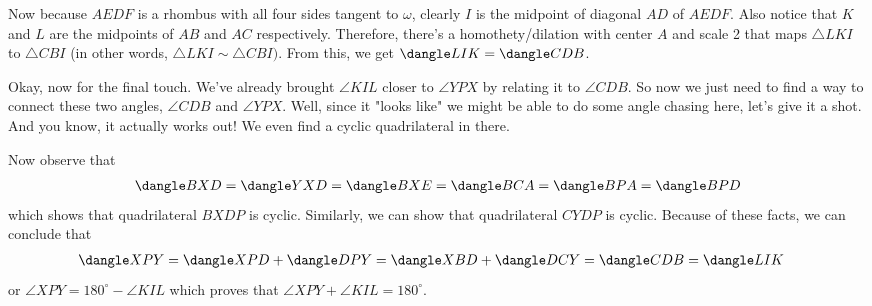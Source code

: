 Now because $AEDF$ is a rhombus with all four sides tangent to $\omega$, clearly $I$ is the midpoint of diagonal $AD$ of $AEDF$. Also notice that $K$ and $L$ are the midpoints of $AB$ and $AC$ respectively.
Therefore, there's a homothety/dilation with center $A$ and scale 2 that maps $\triangle LKI$ to $\triangle CBI$ (in other words, $\triangle LKI \sim \triangle CBI)$. From this, we get $\dangle LIK = \dangle CDB$. 
\begin{comment*}
    Okay, now for the final touch. We've already brought $\angle KIL$ closer to $\angle YPX$ by relating it to $\angle CDB$. So now we just need to find a way to connect these two angles, $\angle CDB$ and $\angle YPX$. Well, since it "looks like" we might be able to do some angle chasing here, let's give it a shot. And you know, it actually works out! We even find a cyclic quadrilateral in there.
\end{comment*}
Now observe that
\begin{align*}
    \dangle BXD = \dangle YXD = \dangle BXE = \dangle BCA = \dangle BPA = \dangle BPD
\end{align*}
which shows that quadrilateral $BXDP$ is cyclic. Similarly, we can show that quadrilateral $CYDP$ is cyclic. Because of these facts, we can conclude that
\begin{align*}
    \dangle XPY &= \dangle XPD + \dangle DPY = \dangle XBD +\dangle DCY = \dangle CDB = \dangle LIK
\end{align*}
or $\angle XPY = 180^\circ - \angle KIL$ which proves that $\angle XPY + \angle KIL = 180^\circ$.


